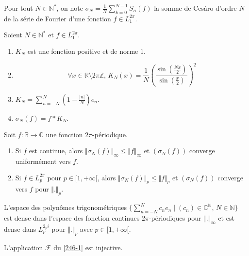 	\begin{notation}
		Pour tout $N \in \mathbb{N}^*$, on note $\sigma_N = \frac{1}{N} \sum_{k=0}^{N-1} S_n(f)$ la somme de Cesàro d'ordre $N$ de la série de Fourier d'une fonction $f \in L_1^{2 \pi}$.
	\end{notation}

	\begin{proposition}
		Soient $N \in \mathbb{N}^*$ et $f \in L_1^{2 \pi}$.
		\begin{enumerate}[label=(\roman*)]
			\item $K_N$ est une fonction positive et de norme $1$.
			\item \[ \forall x \in \mathbb{R} \setminus 2 \pi \mathbb{Z}, \, K_N(x) = \frac{1}{N} \left(\frac{\sin \left( \frac{Nx}{2} \right)}{\sin \left( \frac{x}{2} \right)}\right)^2 \]
			\item $K_N = \sum_{n=-N}^{N} \left(1 - \frac{\vert n \vert}{N}\right) e_n$.
			\item $\sigma_N(f) = f * K_N$.
		\end{enumerate}
	\end{proposition}


	\begin{theorem}[Fejér]
		Soit $f : \mathbb{R} \rightarrow \mathbb{C}$ une fonction $2\pi$-périodique.
		\begin{enumerate}[label=(\roman*)]
			\item Si $f$ est continue, alors $\Vert \sigma_N(f) \Vert_\infty \leq \Vert f \Vert_\infty$ et $(\sigma_N(f))$ converge uniformément vers $f$.
			\item Si $f \in L_p^{2\pi}$ pour $p \in [1,+\infty[$, alors $\Vert \sigma_N(f) \Vert_p \leq \Vert f \Vert_p$ et $(\sigma_N(f))$ converge vers $f$ pour $\Vert . \Vert_p$.
		\end{enumerate}
	\end{theorem}

	\begin{corollary}
		L'espace des polynômes trigonométriques $\{ \sum_{n=-N}^N c_n e_n \mid (c_n) \in \mathbb{C}^{\mathbb{N}}, \, N \in \mathbb{N} \}$ est dense dans l'espace des fonction continues $2\pi$-périodiques pour $\Vert . \Vert_\infty$ et est dense dans $L_p^{2_pi}$ pour $\Vert . \Vert_p$ avec $p \in [1,+\infty[$.
	\end{corollary}


	\begin{application}
		L'application $\mathcal{F}$ du \cref{246-1} est injective.
	\end{application}

